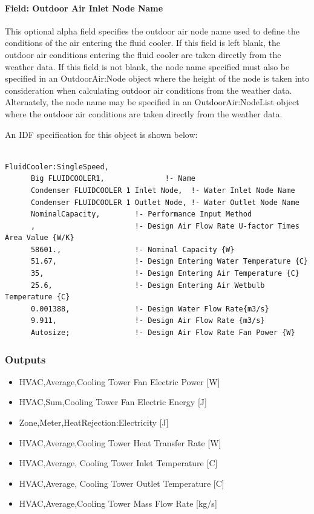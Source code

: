 \paragraph{Field: Outdoor Air Inlet Node Name}\label{field-outdoor-air-inlet-node-name-6}

This optional alpha field specifies the outdoor air node name used to define the conditions of the air entering the fluid cooler. If this field is left blank, the outdoor air conditions entering the fluid cooler are taken directly from the weather data. If this field is not blank, the node name specified must also be specified in an OutdoorAir:Node object where the height of the node is taken into consideration when calculating outdoor air conditions from the weather data. Alternately, the node name may be specified in an OutdoorAir:NodeList object where the outdoor air conditions are taken directly from the weather data.

An IDF specification for this object is shown below:

\begin{lstlisting}

FluidCooler:SingleSpeed,
      Big FLUIDCOOLER1,              !- Name
      Condenser FLUIDCOOLER 1 Inlet Node,  !- Water Inlet Node Name
      Condenser FLUIDCOOLER 1 Outlet Node, !- Water Outlet Node Name
      NominalCapacity,        !- Performance Input Method
      ,                       !- Design Air Flow Rate U-factor Times Area Value {W/K}
      58601.,                 !- Nominal Capacity {W}
      51.67,                  !- Design Entering Water Temperature {C}
      35,                     !- Design Entering Air Temperature {C}
      25.6,                   !- Design Entering Air Wetbulb Temperature {C}
      0.001388,               !- Design Water Flow Rate{m3/s}
      9.911,                  !- Design Air Flow Rate {m3/s}
      Autosize;               !- Design Air Flow Rate Fan Power {W}
\end{lstlisting}

\subsubsection{Outputs}\label{outputs-8-000}

\begin{itemize}
\item
  HVAC,Average,Cooling Tower Fan Electric Power {[}W{]}
\item
  HVAC,Sum,Cooling Tower Fan Electric Energy {[}J{]}
\item
  Zone,Meter,HeatRejection:Electricity {[}J{]}
\item
  HVAC,Average,Cooling Tower Heat Transfer Rate {[}W{]}
\item
  HVAC,Average, Cooling Tower Inlet Temperature {[}C{]}
\item
  HVAC,Average, Cooling Tower Outlet Temperature {[}C{]}
\item
  HVAC,Average,Cooling Tower Mass Flow Rate {[}kg/s{]}
\end{itemize}

